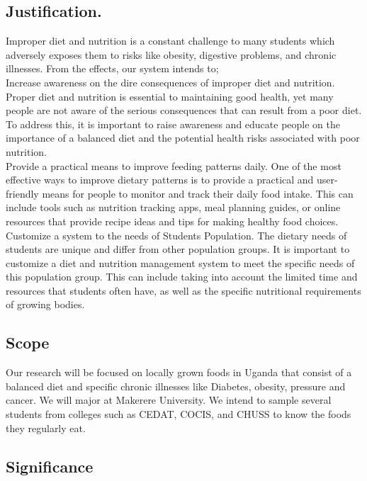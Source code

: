 \documentclass {article}
\begin{document}
\subsection{Justification.}
\noindent Improper diet and nutrition is a constant challenge to many students which adversely exposes them to risks like obesity, digestive problems, and chronic illnesses. From the effects, our system intends to; \\

\noindent Increase awareness on the dire consequences of improper diet and nutrition. Proper diet and nutrition is essential to maintaining good health, yet many people are not aware of the serious consequences that can result from a poor diet. To address this, it is important to raise awareness and educate people on the importance of a balanced diet and the potential health risks associated with poor nutrition.\\

\noindent Provide a practical means to improve feeding patterns daily. One of the most effective ways to improve dietary patterns is to provide a practical and user-friendly means for people to monitor and track their daily food intake. This can include tools such as nutrition tracking apps, meal planning guides, or online resources that provide recipe ideas and tips for making healthy food choices. \\

\noindent Customize a system to the needs of Students Population. The dietary needs of students are unique and differ from other population groups. It is important to customize a diet and nutrition management system to meet the specific needs of this population group. This can include taking into account the limited time and resources that students often have, as well as the specific nutritional requirements of growing bodies.
\subsection{Scope}
\noindent Our research will be focused on locally grown foods in Uganda that consist of a balanced diet and specific chronic illnesses like Diabetes, obesity, pressure and cancer. We will major at Makerere University. We intend to sample several students from colleges such as CEDAT, COCIS, and CHUSS to know the foods they regularly eat.

\subsection{Significance}
\end{document}

